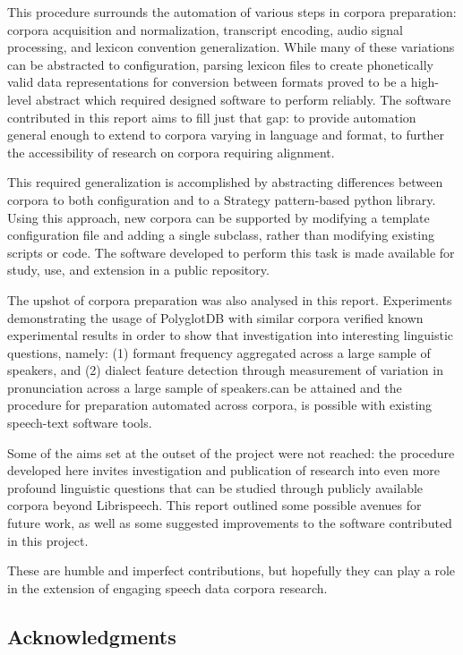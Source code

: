 \documentclass[11pt]{article}
\begin{document}
This procedure surrounds the automation of various steps in corpora preparation: corpora acquisition and normalization, transcript encoding, audio signal processing, and lexicon convention generalization. While many of these variations can be abstracted to configuration, parsing lexicon files to create phonetically valid data representations for conversion between formats proved to be a high-level abstract which required designed software to perform reliably. The software contributed in this report aims to fill just that gap: to provide automation general enough to extend to corpora varying in language and format, to further the accessibility of research on corpora requiring alignment.

This required generalization is accomplished by abstracting differences between corpora to both configuration and to a Strategy pattern-based python library. Using this approach, new corpora can be supported by modifying a template configuration file and adding a single subclass, rather than modifying existing scripts or code. The software developed to perform this task is made available for study, use, and extension in a public repository.

The upshot of corpora preparation was also analysed in this report. Experiments demonstrating the usage of PolyglotDB with similar corpora verified known experimental results in order to show that investigation into interesting linguistic questions, namely: (1) formant frequency aggregated across a large sample of speakers, and (2) dialect feature detection through measurement of variation in pronunciation across a large sample of speakers.can be attained and the procedure for preparation automated across corpora, is possible with existing speech-text software tools.

Some of the aims set at the outset of the project were not reached: the procedure developed here invites investigation and publication of research into even more profound linguistic questions that can be studied through publicly available corpora beyond Librispeech. This report outlined some possible avenues for future work, as well as some suggested improvements to the software contributed in this project.

These are humble and imperfect contributions, but hopefully they can play a role in the extension of engaging speech data corpora research.


\subsection{Acknowledgments}
\end{document}
